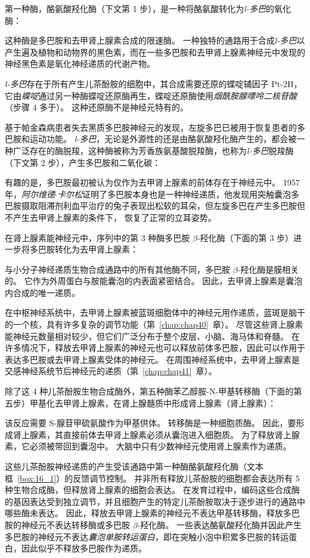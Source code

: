 第一种酶，酪氨酸羟化酶（下文第 1 步），是一种将酪氨酸转化为\textit{l-多巴}的氧化酶：


这种酶是多巴胺和去甲肾上腺素合成的限速酶。
一种独特的通路用于合成\textit{l-多巴}以产生遍及植物和动物界的黑色素，而在一些多巴胺和去甲肾上腺素神经元中发现的神经黑色素是氧化神经递质的代谢产物。


\textit{l-多巴}存在于所有产生儿茶酚胺的细胞中，其合成需要还原的蝶啶辅因子 Pt-2H，它由\textit{蝶啶}通过另一种酶蝶啶还原酶再生，蝶啶还原酶使用\textit{烟酰胺腺嘌呤二核苷酸}（步骤 4 多于）。
这种还原酶不是神经元特有的。


基于帕金森病患者失去黑质多巴胺神经元的发现，左旋多巴已被用于恢复患者的多巴胺和运动功能。
\textit{l-多巴}，无论是外源性的还是由酪氨酸羟化酶产生的，都会被一种广泛存在的酶脱羧，这种酶被称为芳香族氨基酸脱羧酶，也称为\textit{l-多巴}脱羧酶（下文第 2 步），产生多巴胺和二氧化碳：


有趣的是，多巴胺最初被认为仅作为去甲肾上腺素的前体存在于神经元中。
1957 年，\textit{阿尔维德$\cdot$卡尔松}证明了多巴胺本身也是一种神经递质，他发现用突触囊泡多巴胺摄取阻滞剂利血平治疗的兔子表现出松软的耳朵，但左旋多巴在产生多巴胺但不产生去甲肾上腺素的条件下， 恢复了正常的立耳姿势。


在肾上腺素能神经元中，序列中的第 3 种酶多巴胺 $\beta$-羟化酶（下面的第 3 步）进一步将多巴胺转化为去甲肾上腺素：


与小分子神经递质生物合成通路中的所有其他酶不同，多巴胺 $\beta$-羟化酶是膜相关的。
它作为外周蛋白与胺能囊泡的内表面紧密结合。
因此，去甲肾上腺素是囊泡内合成的唯一递质。


在中枢神经系统中，去甲肾上腺素被蓝斑细胞体中的神经元用作递质，蓝斑是脑干的一个核，具有许多复杂的调节功能（第~\ref{chap:chap40}~章）。
尽管这些肾上腺素能神经元数量相对较少，但它们广泛分布于整个皮层、小脑、海马体和脊髓。
在许多情况下，释放去甲肾上腺素的神经元也可以释放前体多巴胺，因此可以作用于表达多巴胺或去甲肾上腺素受体的神经元。
在周围神经系统中，去甲肾上腺素是交感神经系统节后神经元的递质（第~\ref{chap:chap41}~章）。


除了这 4 种儿茶酚胺生物合成酶外，第五种酶苯乙醇胺-N-甲基转移酶（下面的第五步）甲基化去甲肾上腺素，在肾上腺髓质中形成肾上腺素（肾上腺素）：


该反应需要 S-腺苷甲硫氨酸作为甲基供体。
转移酶是一种细胞质酶。
因此，要形成肾上腺素，其直接前体去甲肾上腺素必须从囊泡进入细胞质。
为了释放肾上腺素，它必须被带回到囊泡中。
大脑中只有少数神经元使用肾上腺素作为递质。


这些儿茶酚胺神经递质的产生受该通路中第一种酶酪氨酸羟化酶（文本框~\ref{box:16_1}）的反馈调节控制。
并非所有释放儿茶酚胺的细胞都会表达所有 5 种生物合成酶，但释放肾上腺素的细胞会表达。
在发育过程中，编码这些合成酶的基因表达受到独立调节，并且细胞产生的特定儿茶酚胺取决于逐步进行的通路中哪些酶未表达。
因此，释放去甲肾上腺素的神经元不表达甲基转移酶，释放多巴胺的神经元不表达转移酶或多巴胺 $\beta$-羟化酶。
一些表达酪氨酸羟化酶并因此产生多巴胺的神经元不表达\textit{囊泡单胺转运蛋白}，即在突触小泡中积累多巴胺的转运蛋白，因此似乎不释放多巴胺作为递质。



